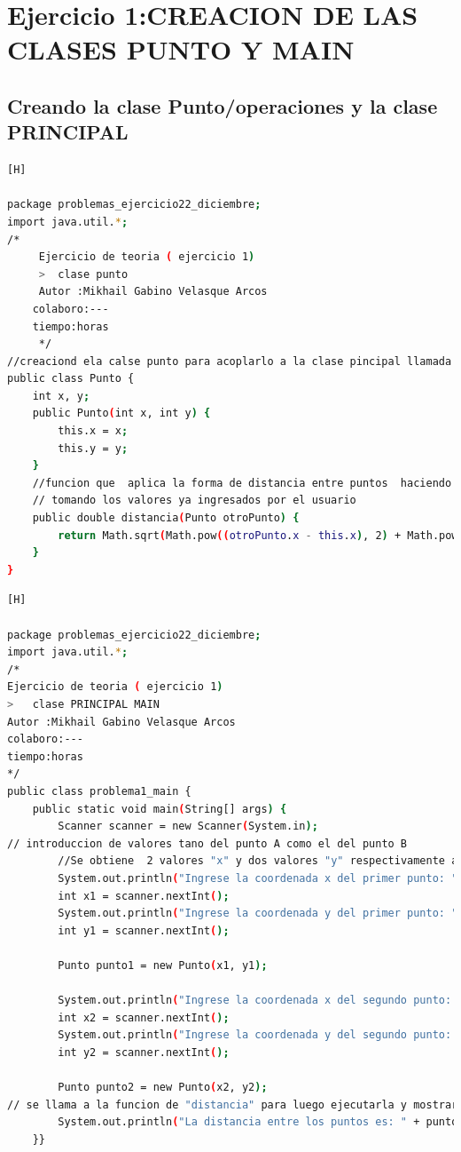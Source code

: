 \documentclass{article}
\begin{document}
	\section{Ejercicio 1:CREACION DE LAS CLASES PUNTO Y MAIN}
	
	\subsection{Creando la clase Punto/operaciones y la clase PRINCIPAL}
		
	\begin{lstlisting}[language=bash,caption={Creando la clase Punto}][H]
	
package problemas_ejercicio22_diciembre;
import java.util.*;
/*
	 Ejercicio de teoria ( ejercicio 1)
	 >	clase punto 
	 Autor :Mikhail Gabino Velasque Arcos
	colaboro:---
	tiempo:horas
	 */
//creaciond ela calse punto para acoplarlo a la clase pincipal llamada problema1_mains
public class Punto {
    int x, y;
    public Punto(int x, int y) {
        this.x = x;
        this.y = y;
    }
    //funcion que  aplica la forma de distancia entre puntos  haciendo el uso de math , pow(potencia), sqrt(raiz)
    // tomando los valores ya ingresados por el usuario 
    public double distancia(Punto otroPunto) {
        return Math.sqrt(Math.pow((otroPunto.x - this.x), 2) + Math.pow((otroPunto.y - this.y), 2));
    }
}	
	\end{lstlisting}
	\begin{lstlisting}[language=bash,caption={Creando la clase Main}][H]

package problemas_ejercicio22_diciembre;
import java.util.*;
/*
Ejercicio de teoria ( ejercicio 1)
>	clase PRINCIPAL MAIN 
Autor :Mikhail Gabino Velasque Arcos
colaboro:---
tiempo:horas
*/
public class problema1_main {
    public static void main(String[] args) {
        Scanner scanner = new Scanner(System.in);
// introduccion de valores tano del punto A como el del punto B 
        //Se obtiene  2 valores "x" y dos valores "y" respectivamente a los puntos ya antes mencionados
        System.out.println("Ingrese la coordenada x del primer punto: ");
        int x1 = scanner.nextInt();
        System.out.println("Ingrese la coordenada y del primer punto: ");
        int y1 = scanner.nextInt();

        Punto punto1 = new Punto(x1, y1);

        System.out.println("Ingrese la coordenada x del segundo punto: ");
        int x2 = scanner.nextInt();
        System.out.println("Ingrese la coordenada y del segundo punto: ");
        int y2 = scanner.nextInt();

        Punto punto2 = new Punto(x2, y2);
// se llama a la funcion de "distancia" para luego ejecutarla y mostrar el resultado
        System.out.println("La distancia entre los puntos es: " + punto1.distancia(punto2));
    }}

	\end{lstlisting}	
	
\end{document}
